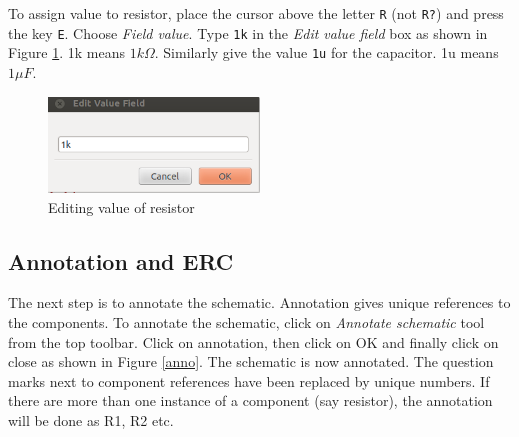 To assign value to resistor, place the cursor above the letter {\tt R} (not {\tt R?}) and press the key {\tt E}. Choose \textit{Field value}. Type {\tt 1k} in the \textit{Edit value field} box as shown in Figure \ref{field}. 1k means $1k\Omega$. Similarly give the value {\tt 1u} for the capacitor. 1u means $1\mu F$. 
\begin{figure}
\centering
\includegraphics[width=0.5\textwidth]{figures/field}
\caption{Editing value of resistor}
\label{field}
\end{figure}
\subsection{Annotation and ERC}
\label{ann} 
The next step is to annotate the schematic. Annotation gives unique references to the components. To annotate the schematic, click on \textit{Annotate schematic} tool from the top toolbar. Click on annotation, then click on OK and finally click on close as shown in Figure \ref{anno}. The schematic is now annotated. The question marks next to component references have been replaced by unique numbers. If there are more than one instance of a component (say resistor), the annotation will be done as R1, R2 etc.


